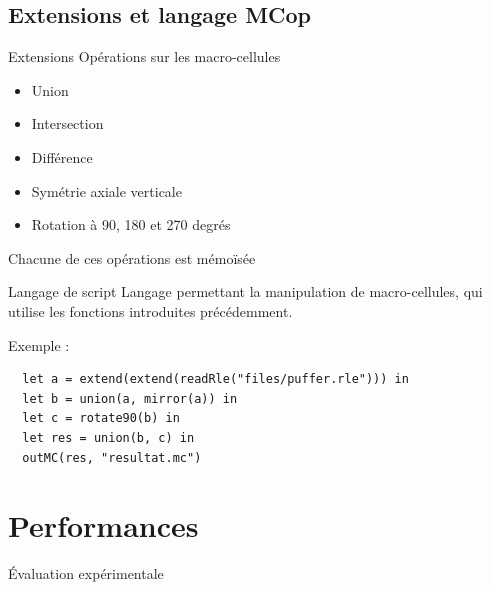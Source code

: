 \documentclass{beamer}
\begin{document}
\subsection{Extensions et langage MCop} 

\begin{frame}{Extensions} 
  Opérations sur les macro-cellules
  \begin{itemize}
    \item Union
    \item Intersection
    \item Différence
    \item Symétrie axiale verticale
    \item Rotation à 90, 180 et 270 degrés
  \end{itemize}

  \medskip

  Chacune de ces opérations est \alert{mémoïsée}

\end{frame}

\begin{frame}[fragile]{Langage de script}
  Langage permettant la manipulation de macro-cellules, qui utilise
  les fonctions introduites précédemment.

  \medskip

  Exemple :
\begin{verbatim}
  let a = extend(extend(readRle("files/puffer.rle"))) in
  let b = union(a, mirror(a)) in
  let c = rotate90(b) in
  let res = union(b, c) in
  outMC(res, "resultat.mc")
\end{verbatim}

\end{frame}

\section{Performances}

\begin{frame}
  \begin{center}
    Évaluation expérimentale
  \end{center}
\end{frame}
\end{document}
